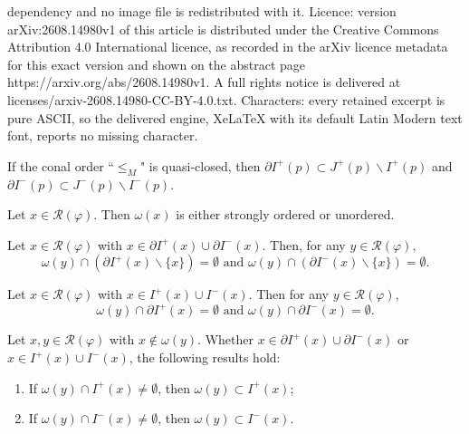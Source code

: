 \documentclass[10pt,a4paper]{amsart}
\begin{document}
dependency and no image file is redistributed with it. Licence: version arXiv:2608.14980v1 of this article is distributed under the Creative Commons Attribution 4.0 International licence, as recorded in the arXiv licence metadata for this exact version and shown on the abstract page https://arxiv.org/abs/2608.14980v1. A full rights notice is delivered at licenses/arxiv-2608.14980-CC-BY-4.0.txt. Characters: every retained excerpt is pure ASCII, so the delivered engine, XeLaTeX with its default Latin Modern text font, reports no missing character.
\begin{prop}\label{quasi-closed-prop}
	If the conal order ``$\leq_M$" is quasi-closed, then $\partial I^{+}(p)\subset J^{+}(p)\backslash I^{+}(p)$ and $\partial I^{-}(p)\subset J^{-}(p)\backslash I^{-}(p)$.
\end{prop}	

\begin{prop}\label{ou}
	Let $x\in \mathcal{R}(\varphi)$. Then $\omega(x)$ is either strongly ordered or unordered.
\end{prop}

	\begin{prop}\label{sep_n_1}
		Let $x\in \mathcal{R}(\varphi)$ with $x\in \partial I^{+}(x)\cup\partial I^{-}(x)$. Then, for any $y\in \mathcal{R}(\varphi)$, 
		\begin{equation*}
			\omega(y)\cap(\partial I^{+}(x)\backslash\{x\})=\emptyset \text{~and~} \omega(y)\cap(\partial I^{-}(x)\backslash\{x\})=\emptyset.
		\end{equation*}
	\end{prop}

    \begin{prop}\label{sep_n_2}
		Let $x\in \mathcal{R}(\varphi)$ with $x\in I^{+}(x)\cup I^{-}(x)$. Then for any $y\in \mathcal{R}(\varphi)$,
        \begin{equation*}
			\omega(y)\cap\partial I^{+}(x)=\emptyset \text{~and~} \omega(y)\cap\partial I^{-}(x)=\emptyset.
		\end{equation*}
	\end{prop}

	\begin{cor}\label{absorb}
		Let $x,y\in \mathcal{R}(\varphi)$ with $x\notin\omega(y)$. Whether $x\in \partial I^{+}(x)\cup \partial I^{-}(x)$ or $x\in I^{+}(x)\cup I^{-}(x)$, the following results hold: 
        \begin{enumerate}[{\rm (i)}]
            \item If $\omega(y)\cap I^{+}(x)\neq\emptyset$, then $\omega(y)\subset I^{+}(x)$;
            \item If $\omega(y)\cap I^{-}(x)\neq\emptyset$, then $\omega(y)\subset I^{-}(x)$.
        \end{enumerate}
	\end{cor}
\end{document}
